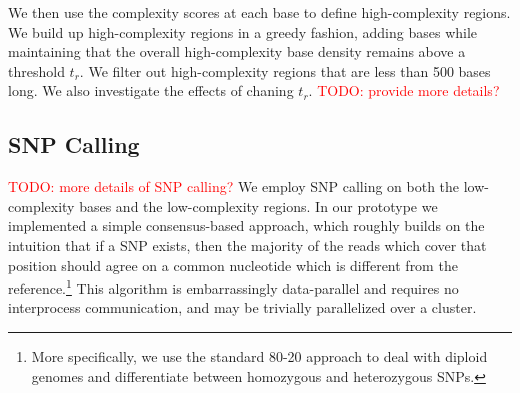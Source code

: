 \documentclass[12pt]{article}
\newcommand\TODO[1]{\textcolor{red}{TODO: #1}}
\begin{document}
We then use the complexity scores at each base to define high-complexity regions. We build up high-complexity regions in a greedy fashion, adding bases while maintaining that the overall high-complexity base density remains above a threshold $t_r$. We filter out high-complexity regions that are less than 500 bases long. We also investigate the effects of chaning $t_r$.
\TODO{provide more details?}

\subsection{SNP Calling}
\vspace{-6pt}

\TODO{more details of SNP calling?}
We employ SNP calling on both the low-complexity bases and the low-complexity regions. In
our prototype we implemented a simple consensus-based approach, which roughly
builds on the intuition that if a SNP exists, then the majority of the reads
which cover that position should agree on a common nucleotide which is
different from the reference.\footnote{More specifically, we use the standard
80-20 approach \cite{gatk} to deal with diploid genomes and differentiate
between homozygous and heterozygous SNPs.}
This algorithm is embarrassingly data-parallel and requires no interprocess
communication, and may be trivially parallelized over a cluster.  
\end{document}
